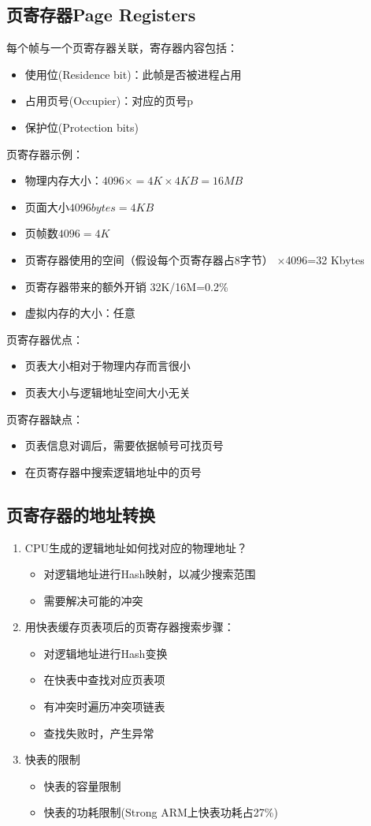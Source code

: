 \subsection{页寄存器Page Registers}
每个帧与一个页寄存器关联，寄存器内容包括：
\begin{itemize}
	\item 使用位(Residence bit)：此帧是否被进程占用
	\item 占用页号(Occupier)：对应的页号p
	\item 保护位(Protection bits)
\end{itemize}
页寄存器示例：
\begin{itemize}
	\item 物理内存大小：$4096\times=4K\times4KB=16MB$
	\item 页面大小$4096 bytes = 4KB$
	\item 页帧数$4096=4K$
	\item 页寄存器使用的空间（假设每个页寄存器占8字节）
	$\times$4096=32 Kbytes
	\item 页寄存器带来的额外开销
	\subitem 32K/16M=0.2\%
	\item 虚拟内存的大小：任意
\end{itemize}
页寄存器优点：
\begin{itemize}
	\item 页表大小相对于物理内存而言很小
	\item 页表大小与逻辑地址空间大小无关
\end{itemize}
页寄存器缺点：
\begin{itemize}
	\item 页表信息对调后，需要依据帧号可找页号
	\item 在页寄存器中搜索逻辑地址中的页号
\end{itemize}
\subsection{页寄存器的地址转换}
\begin{enumerate}
	\item CPU生成的逻辑地址如何找对应的物理地址？
	\begin{itemize}
		\item 对逻辑地址进行Hash映射，以减少搜索范围
		\item 需要解决可能的冲突
	\end{itemize}
\item 用快表缓存页表项后的页寄存器搜索步骤：
\begin{itemize}
	\item 对逻辑地址进行Hash变换
	\item 在快表中查找对应页表项
	\item 有冲突时遍历冲突项链表
	\item 查找失败时，产生异常
\end{itemize}
\item 快表的限制
\begin{itemize}
	\item 快表的容量限制
	\item 快表的功耗限制(Strong ARM上快表功耗占27\%)
\end{itemize}
\end{enumerate}
